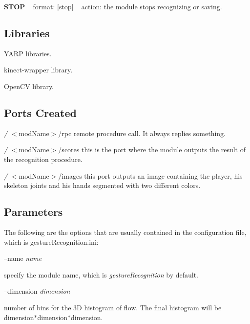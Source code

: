 {\bfseries S\+T\+OP} ~\newline
format\+: \mbox{[}stop\mbox{]} ~\newline
action\+: the module stops recognizing or saving.\hypertarget{group__gestureRecognitionStereo_lib_sec}{}\subsection{Libraries}\label{group__gestureRecognitionStereo_lib_sec}

\begin{DoxyItemize}
\item Y\+A\+RP libraries.
\item kinect-\/wrapper library.
\item Open\+CV library.
\end{DoxyItemize}\hypertarget{group__gestureRecognitionStereo_portsc_sec}{}\subsection{Ports Created}\label{group__gestureRecognitionStereo_portsc_sec}

\begin{DoxyItemize}
\item {\itshape /} $<$mod\+Name$>$/rpc remote procedure call. It always replies something.
\item {\itshape /} $<$mod\+Name$>$/scores this is the port where the module outputs the result of the recognition procedure.
\item {\itshape /} $<$mod\+Name$>$/images this port outputs an image containing the player, his skeleton joints and his hands segmented with two different colors.
\end{DoxyItemize}\hypertarget{group__gestureRecognitionStereo_parameters_sec}{}\subsection{Parameters}\label{group__gestureRecognitionStereo_parameters_sec}
The following are the options that are usually contained in the configuration file, which is gesture\+Recognition.\+ini\+:

--name {\itshape name} 
\begin{DoxyItemize}
\item specify the module name, which is {\itshape gesture\+Recognition} by default.
\end{DoxyItemize}

--dimension {\itshape dimension} 
\begin{DoxyItemize}
\item number of bins for the 3D histogram of flow. The final histogram will be dimension$\ast$dimension$\ast$dimension.
\end{DoxyItemize}

